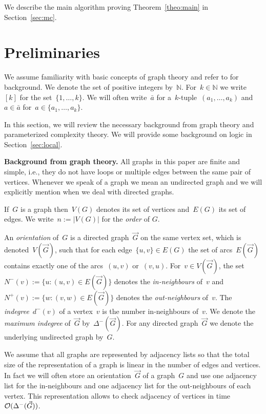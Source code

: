 \documentclass[11pt]{article}
\numberwithin{equation}{section}
\newcommand{\N}{{\mathbb N}} \newcommand{\Q}{{\mathbb Q}}
\newcommand{\Oof}{\mbox{$\cal O$}}
\newcommand{\tup}[1]{\bar{#1}}
\begin{document}
We describe the main algorithm proving Theorem~\ref{theo:main} in
Section~\ref{sec:mc}.
\parskip0pt



\section{Preliminaries}
\label{sec:prelim}

We assume familiarity with basic concepts of graph theory and refer to
\cite{Diestel05} for background. We denote the set of positive
integers by~$\N$. For~$k\in\N$ we write~$[k]$ for the set~$\{1,\ldots,
k\}$. We will often write~$\tup{a}$ for a~$k$-tuple~$(a_1,\ldots,
a_k)$ and~$a\in\tup{a}$ for~$a\in\{a_1,\ldots, a_k\}$.

In this section, we will review the necessary background from graph
theory and parameterized complexity theory. We will provide some
background on logic in Section~\ref{sec:local}.

\smallskip

\noindent\textbf{Background from graph theory. } All graphs in this
paper are finite and simple, i.e., they do not have loops or multiple
edges between the same pair of vertices. Whenever we speak of a graph
we mean an undirected graph and we will explicitly mention when we
deal with directed graphs.

If~$G$ is a graph then~$V(G)$ denotes its set of vertices and~$E(G)$
its set of edges. We write~$n := |V(G)|$ for the \emph{order} of $G$.

An \emph{orientation} of~$G$ is a directed graph~$\vec{G}$ on the same
vertex set, which is denoted~$V(\vec{G})$, such that for each
edge~$\{u,v\}\in E(G)$ the set of arcs~$E(\vec{G})$ contains exactly
one of the arcs~$(u,v)$ or~$(v,u)$. For~$v\in V(\vec{G})$, the
set~$N^-(v):=\{u : (u,v)\in E(\vec{G})\}$ denotes the
\emph{in-neighbours} of~$v$ and~$N^+(v):=\{w : (v,w)\in E(\vec{G})\}$
denotes the \emph{out-neighbours} of~$v$.  The
\emph{indegree}~$d^-(v)$ of a vertex~$v$ is the number in-neighbours
of~$v$. We denote the \emph{maximum indegree} of~$\vec{G}$
by~$\Delta^-(\vec{G})$. For any directed graph~$\vec{G}$ we denote the
underlying undirected graph by~$G$.

We assume that all graphs are represented by adjacency lists so that
the total size of the representation of a graph is linear in the
number of edges and vertices. In fact we will often store an
orientation~$\vec{G}$ of a graph~$G$ and use one adjacency list for
the in-neighbours and one adjacency list for the out-neighbours of
each vertex. This representation allows to check adjacency of vertices
in time~$\Oof(\Delta^-(\vec{G}))$.
\end{document}
